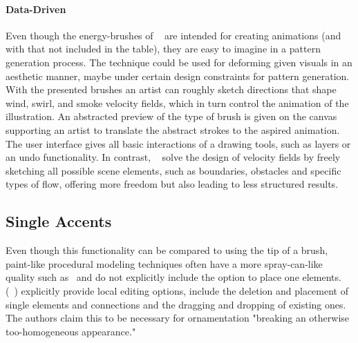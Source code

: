 \paragraph*{Data-Driven}
Even though the energy-brushes of \citeauthor*{xing_2016_eit}~\cite{xing_2016_eit} are intended for creating animations (and with that not included in the table), they are easy to imagine in a pattern generation process. The technique could be used for deforming given visuals in an aesthetic manner, maybe under certain design constraints for pattern generation. With the presented brushes an artist can roughly sketch directions that shape wind, swirl, and smoke velocity fields, which in turn control the animation of the illustration. An abstracted preview of the type of brush is given on the canvas supporting an artist to translate the abstract strokes to the aspired animation. The user interface gives all basic interactions of a drawing tools, such as layers or an undo functionality. In contrast, \citeauthor*{hu_2019_ssf}~\cite{hu_2019_ssf} solve the design of velocity fields by freely sketching all possible scene elements, such as boundaries, obstacles and specific types of flow, offering more freedom but also leading to less structured results. 


\subsection{Single Accents}
\label{subsubsec:analysis_single_accents}

Even though this functionality can be compared to using the tip of a brush, paint-like procedural modeling techniques often have a more spray-can-like quality such as~\cite{mech_2012_tdf} and do not explicitly include the option to place one elements. \citeauthor*{gieseke_2017_ooo}~\cite{gieseke_2017_ooo} (~) explicitly provide local editing options, include the deletion and placement of single elements and connections and the dragging and dropping of existing ones. The authors claim this to be necessary for ornamentation "breaking an otherwise too-homogeneous appearance."

